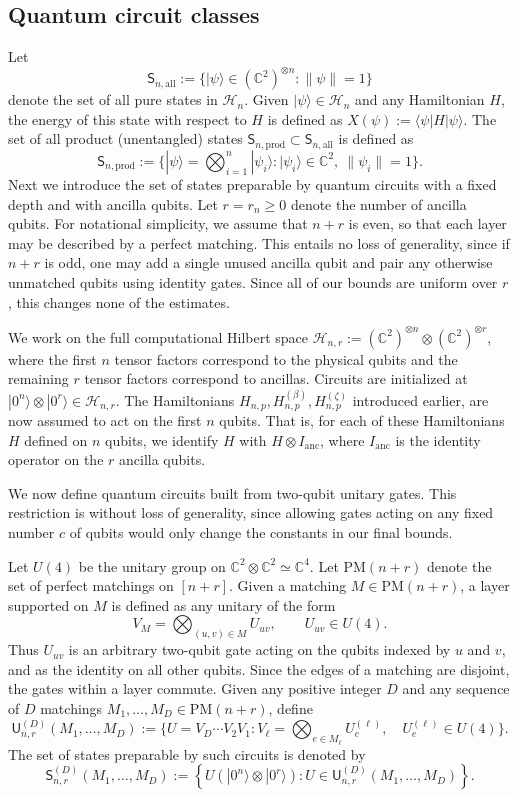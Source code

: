 \documentclass[12pt]{article}
\newcommand{\C}{\mathbb{C}}
\newcommand{\mcH}{\mathcal{H}}
\begin{document}
\subsection{Quantum circuit classes}
Let
\[
    \mathsf{S}_{n,\mathrm{all}}
    :=
    \{|\psi\rangle\in(\C^2)^{\otimes n}:\|\psi\|=1\}
\]
denote the set of all pure states in $\mcH_n$. Given \(|\psi\rangle \in\mcH_n\) and any Hamiltonian $H$,
the energy of this state with respect to $H$ is defined as 
$X(\psi):= \langle \psi|H|\psi\rangle$.  
The set of all product (unentangled) 
states $\mathsf{S}_{n,\mathrm{prod}}\subset \mathsf{S}_{n,\mathrm{all}}$ is defined as
\[
    \mathsf{S}_{n,\mathrm{prod}}
    :=
    \bigg\{
    |\psi\rangle=\bigotimes_{i=1}^n|\psi_i\rangle:
    |\psi_i\rangle\in\C^2,\ \|\psi_i\|=1
    \bigg\}.
\]
Next we introduce the set of states preparable by  quantum circuits with a fixed depth and  with
ancilla qubits.
Let \(r=r_n\ge 0\) denote the number of ancilla qubits. For notational
simplicity, we assume that \(n+r\) is even, so that each layer may be described
by a perfect matching. This entails no loss of generality, since if \(n+r\) is odd,
one may add a single unused ancilla qubit and pair any otherwise unmatched
qubits using identity gates. Since all of our bounds are uniform over \(r\),
this changes none of the estimates.

We work on the full computational Hilbert space $\mcH_{n,r} := (\C^2)^{\otimes n}\otimes(\C^2)^{\otimes r}$, where the first \(n\) tensor factors correspond to the physical qubits and the
remaining $r$ tensor factors correspond to ancillas. Circuits are initialized
at $|0^n\rangle\otimes |0^r\rangle \in \mcH_{n,r}$. The Hamiltonians
$H_{n,p}, H_{n,p}^{(\beta)}, H_{n,p}^{(\zeta)}$ introduced earlier, are now assumed
to act on the first $n$ qubits. That is, for each of these Hamiltonians $H$
defined on  $n$ qubits, we identify $H$ with $H\otimes I_{\mathrm{anc}}$, 
where \(I_{\mathrm{anc}}\) is the identity operator on the $r$ ancilla qubits.

We now define quantum circuits built from two-qubit unitary gates. This restriction is without loss of generality, since allowing gates acting on any fixed number $c$ of qubits would only change the constants in our final bounds.

Let \(U(4)\) be the unitary group on \(\C^2\otimes \C^2\simeq \C^4\).
Let \(\mathrm{PM}(n+r)\) denote the set of perfect matchings on
\([n+r]\). Given a matching \(M\in\mathrm{PM}(n+r)\), a layer
supported on \(M\) is defined as any  unitary of the form
\[
    V_M
    =
    \bigotimes_{(u,v)\in M} U_{uv},
    \qquad
    U_{uv}\in U(4).
\]
 Thus \(U_{uv}\) is an arbitrary two-qubit gate acting on the qubits indexed by $u$ and $v$, and as the identity on all other qubits. Since the edges of a matching are disjoint, the gates within a layer commute. Given any positive integer $D$ and 
 any sequence of $D$ matchings
 \(M_1,\dots,M_D\in\mathrm{PM}(n+r)\), define
\[
\mathsf{U}^{(D)}_{n,r}(M_1,\dots,M_D)
:=
\bigg\{
U=V_D\cdots V_2V_1:
V_\ell=\bigotimes_{e\in M_\ell}U_e^{(\ell)},
\quad
U_e^{(\ell)}\in U(4)
\bigg\}.
\]
The set of  states preparable by such circuits is denoted by
\[
\mathsf{S}_{n,r}^{(D)}(M_1,\dots,M_D)
:=
\left\{
U(|0^n\rangle\otimes |0^r\rangle):
U\in\mathsf{U}^{(D)}_{n,r}(M_1,\dots,M_D)
\right\}.
\]
\end{document}
